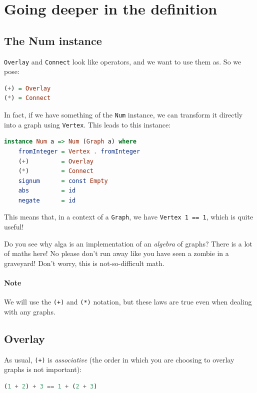 \documentclass[10pt,a4paper]{article}
\begin{document}
\section{Going deeper in the definition}

\subsection{The Num instance}
\verb|Overlay| and \verb|Connect| look like operators, and we want to use them as. So we pose:

\begin{lstlisting}[language=Haskell, frame=single]
(+) = Overlay
(*) = Connect
\end{lstlisting}

In fact, if we have something of the \verb|Num| instance, we can transform it directly into a graph using \verb|Vertex|. This leads to this instance:

\begin{lstlisting}[language=Haskell, frame=single]
instance Num a => Num (Graph a) where
	fromInteger = Vertex . fromInteger
	(+)         = Overlay
	(*)         = Connect
	signum      = const Empty
	abs         = id
	negate      = id
\end{lstlisting}

This means that, in a context of a \verb|Graph|, we have \verb|Vertex 1 == 1|, which is quite useful!

Do you see why alga is an implementation of an \emph{algebra} of graphs? There is a lot of maths here! No please don't run away like you have seen a zombie in a graveyard! Don't worry, this is not-so-difficult math.

\paragraph{Note}
We will use the \verb|(+)| and \verb|(*)| notation, but these laws are true even when dealing with any graphs.

\subsection{Overlay}

As usual, \verb|(+)| is \emph{associative} (the order in which you are choosing to overlay graphs is not important):
\begin{lstlisting}[language=Haskell, frame=single]
(1 + 2) + 3 == 1 + (2 + 3)
\end{lstlisting}
\end{document}
